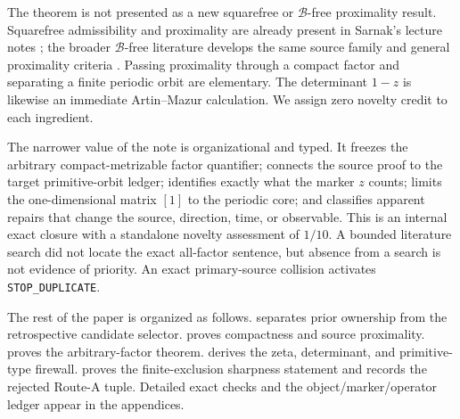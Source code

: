

The theorem is not presented as a new squarefree or
\(\mathscr B\)-free proximality result.  Squarefree admissibility and
proximality are already present in Sarnak's lecture notes
\citep{sarnak2011mobius}; the broader \(\mathscr B\)-free literature develops
the same source family and general proximality criteria
\citep{elabdalaoui2015bfree,bartnicka2018bfree,kasjan2019window}.  Passing
proximality through a compact factor and separating a finite periodic orbit
are elementary.  The determinant \(1-z\) is likewise an immediate
Artin--Mazur calculation.  We assign zero novelty credit to each ingredient.

The narrower value of the note is organizational and typed.  It freezes the
arbitrary compact-metrizable factor quantifier; connects the source proof to
the target primitive-orbit ledger; identifies exactly what the marker \(z\)
counts; limits the one-dimensional matrix \([1]\) to the periodic core; and
classifies apparent repairs that change the source, direction, time, or
observable.  This is an internal exact closure with a standalone novelty
assessment of \(1/10\).  A bounded literature search did not locate the exact
all-factor sentence, but absence from a search is not evidence of priority.
An exact primary-source collision activates \texttt{STOP\_DUPLICATE}.

The rest of the paper is organized as follows.  
separates prior ownership from the retrospective candidate selector.
 proves compactness and source proximality.
 proves the arbitrary-factor theorem.
 derives the zeta, determinant, and primitive-type
firewall.   proves the finite-exclusion sharpness
statement and records the rejected Route-A tuple.  Detailed exact checks and
the object/marker/operator ledger appear in the appendices.

